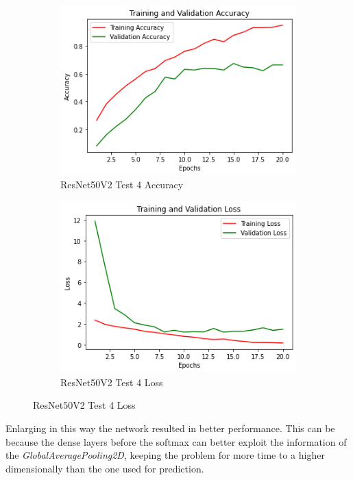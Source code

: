 \begin{figure}[H]
	\begin{subfigure}{0.5\textwidth}
		\includegraphics[width=0.9\linewidth]{img/resnet50v2/resnet50finetuned1denseacc.png} 
		\caption{ResNet50V2 Test 4 Accuracy}
		\label{fig:resnet50finetuned1denseacc}
	\end{subfigure}
	\begin{subfigure}{0.5\textwidth}
		\includegraphics[width=0.9\linewidth]{img/resnet50v2/resnet50finetuned1denseloss.png}
		\caption{ResNet50V2 Test 4 Loss}
		\label{fig:resnet50finetuned1denseloss}
	\end{subfigure}
\end{figure}

Enlarging in this way the network resulted in better performance. This can be because the dense layers before the softmax can better exploit the information of the \textit{GlobalAveragePooling2D}, keeping the problem for more time to a higher dimensionally than the one used for prediction.


